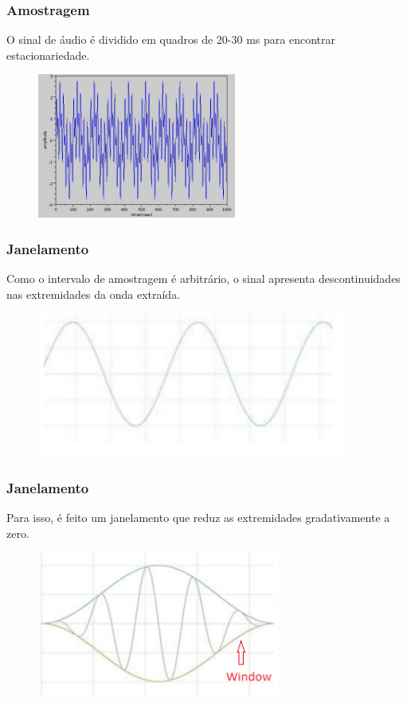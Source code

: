 \documentclass{beamer}
\begin{document}
\begin{frame} %
    \frametitle{Amostragem}

    O sinal de áudio é dividido em quadros de 20-30 ms para encontrar estacionariedade.

    \begin{figure}[]
        \centering
        \includegraphics[height=135pt]{fig3.png}
        \centering

    \end{figure}

\end{frame}

\begin{frame} %
    \frametitle{Janelamento}

    Como o intervalo de amostragem é arbitrário, o sinal apresenta descontinuidades nas extremidades da onda extraída.

    \begin{figure}[]
        \centering
        \includegraphics[height=135pt]{fig5.png}
        \centering

    \end{figure}
\end{frame}

\begin{frame} %
    \frametitle{Janelamento}

    Para isso, é feito um janelamento que reduz as extremidades gradativamente a zero. 

    \begin{figure}[]
        \centering
        \includegraphics[height=135pt]{fig6.png}
        \centering

    \end{figure}
\end{frame}
\end{document}
